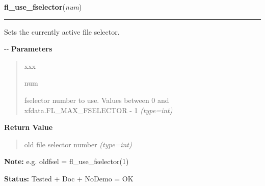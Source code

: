 \hspace{.8\funcindent}\begin{boxedminipage}{\funcwidth}

    \raggedright \textbf{fl\_use\_fselector}(\textit{num})

    \vspace{-1.5ex}

    \rule{\textwidth}{0.5\fboxrule}
\setlength{\parskip}{2ex}

Sets the currently active file selector.

-{}-
\setlength{\parskip}{1ex}
      \textbf{Parameters}
      \vspace{-1ex}

      \begin{quote}
        \begin{Ventry}{xxx}

          \item[num]


fselector number to use. Values between 0 and
xfdata.FL\_MAX\_FSELECTOR - 1
            {\it (type=int)}

        \end{Ventry}

      \end{quote}

      \textbf{Return Value}
    \vspace{-1ex}

      \begin{quote}

old file selector number
      {\it (type=int)}

      \end{quote}

\textbf{Note:} 
e.g. oldfsel = fl\_use\_fselector(1)


\textbf{Status:} 
Tested + Doc + NoDemo = OK


    \end{boxedminipage}

    \label{xformslib:flgoodies:fl_show_fselector}

    \vspace{0.5ex}

